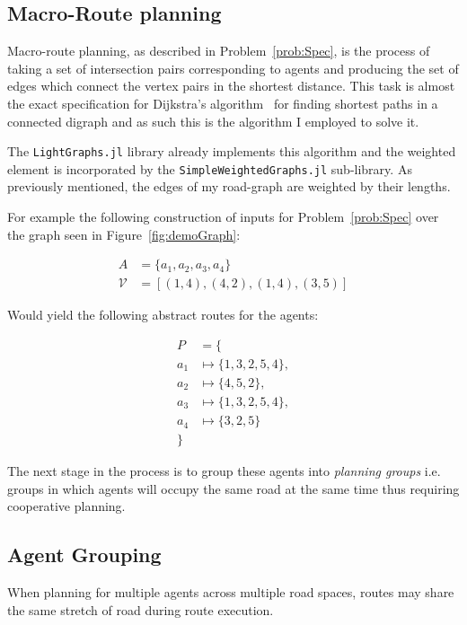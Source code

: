 \subsection{Macro-Route planning}
\label{sec:mrp}

Macro-route planning, as described in Problem~\ref{prob:Spec}, is the process of taking a set of intersection pairs corresponding to agents and producing the set of edges which connect the vertex pairs in the shortest distance. This task is almost the exact specification for Dijkstra's algorithm~\cite{dijkstra1959note} for finding shortest paths in a connected digraph and as such this is the algorithm I employed to solve it.

The \texttt{LightGraphs.jl} library already implements this algorithm and the weighted element is incorporated by the \texttt{SimpleWeightedGraphs.jl} sub-library. As previously mentioned, the edges of my road-graph are weighted by their lengths.

For example the following construction of inputs for Problem~\ref{prob:Spec} over the graph seen in Figure~\ref{fig:demoGraph}:

\begin{align*}
  A &= \{ a_{1},a_{2},a_{3},a_{4} \} \\
  \mathcal{V} &= [ (1,4), (4,2), (1,4), (3,5) ]
\end{align*}

Would yield the following abstract routes for the agents:


\begin{align*}
  P &= \{ \\
  a_{1} &\mapsto \{ 1,3,2,5,4 \}, \\
  a_{2} &\mapsto \{ 4,5,2 \}, \\
  a_{3} &\mapsto \{ 1,3,2,5,4 \} ,\\
  a_{4} &\mapsto \{ 3,2,5 \} \\
          \}
\end{align*}

The next stage in the process is to group these agents into \textit{planning groups} i.e. groups in which agents will occupy the same road at the same time thus requiring cooperative planning.

\subsection{Agent Grouping}

When planning for multiple agents across multiple road spaces, routes may share the same stretch of road during route execution.

